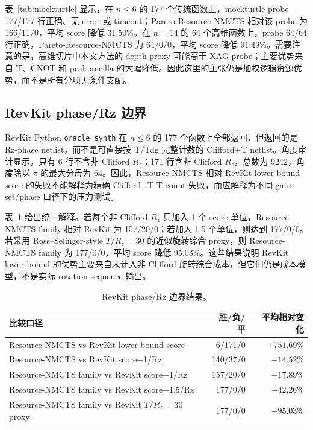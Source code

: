 \documentclass[UTF8,fontset=macnew,11pt]{ctexart}
\newcommand{\method}{Resource-NMCTS}
\newcommand{\rz}{\ensuremath{R_z}}
\begin{document}
表~\ref{tab:mockturtle} 显示，在 $n\leq6$ 的 177 个传统函数上，mockturtle probe 177/177 行正确、无 error 或 timeout；Pareto-\method{} 相对该 probe 为 166/11/0，平均 score 降低 31.50\%。在 $n=14$ 的 64 个高维函数上，probe 64/64 行正确，Pareto-\method{} 为 64/0/0，平均 score 降低 91.49\%。需要注意的是，高维切片中本文方法的 depth proxy 可能高于 XAG probe；主要优势来自 T、CNOT 和 peak ancilla 的大幅降低。因此这里的主张仍是加权逻辑资源优势，而不是所有分项无条件支配。

\subsection{RevKit phase/Rz 边界}

RevKit Python \texttt{oracle\_synth} 在 $n\leq6$ 的 177 个函数上全部返回，但返回的是 Rz-phase netlist，而不是可直接按 T/Tdg 完整计数的 Clifford+T netlist。角度审计显示，只有 6 行不含非 Clifford \rz{}；171 行含非 Clifford \rz{}，总数为 9242，角度除以 $\pi$ 的最大分母为 64。因此，\method{} 相对 RevKit lower-bound score 的失败不能解释为精确 Clifford+T T-count 失败，而应解释为不同 gate-set/phase 口径下的压力测试。

表~\ref{tab:rz-boundary} 给出统一解释。若每个非 Clifford \rz{} 只加入 1 个 score 单位，Resource-NMCTS family 相对 RevKit 为 157/20/0；若加入 1.5 个单位，则达到 177/0/0。若采用 Ross--Selinger-style $T/R_z=30$ 的近似旋转综合 proxy，则 Resource-NMCTS family 为 177/0/0，平均 score 降低 95.03\%。这些结果说明 RevKit lower-bound 的优势主要来自未计入非 Clifford 旋转综合成本，但它们仍是成本模型，不是实际 rotation sequence 输出。

\begin{table}[H]
\centering
\small
\caption{RevKit phase/Rz 边界结果。}
\label{tab:rz-boundary}
\begin{tabularx}{\linewidth}{>{\raggedright\arraybackslash}Xrr}
\toprule
比较口径 & 胜/负/平 & 平均相对变化 \\
\midrule
\method{} vs RevKit lower-bound score & 6/171/0 & $+751.69\%$ \\
\method{} vs RevKit score+1/Rz & 140/37/0 & $-14.52\%$ \\
Resource-NMCTS family vs RevKit score+1/Rz & 157/20/0 & $-17.89\%$ \\
Resource-NMCTS family vs RevKit score+1.5/Rz & 177/0/0 & $-42.26\%$ \\
Resource-NMCTS family vs RevKit $T/R_z=30$ proxy & 177/0/0 & $-95.03\%$ \\
\bottomrule
\end{tabularx}
\end{table}
\end{document}
